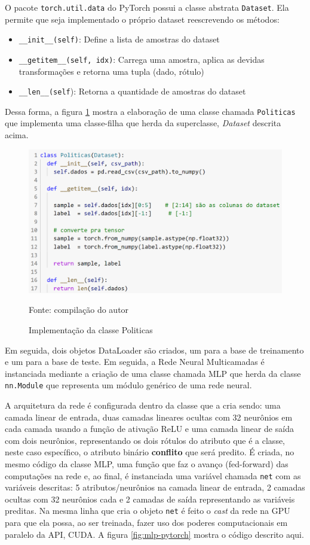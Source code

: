 O pacote \texttt{torch.util.data} do PyTorch possui a classe abstrata \texttt{Dataset}. Ela permite que seja implementado o próprio dataset reescrevendo os métodos: 

\begin{itemize}
	\item \texttt{\_\_init\_\_(self)}: Define a lista de amostras do dataset
	\item \texttt{\_\_getitem\_\_(self, idx)}: Carrega uma amostra, aplica as devidas transformações e retorna uma tupla (dado, rótulo)
	\item \texttt{\_\_len\_\_(self}): Retorna a quantidade de amostras do dataset
\end{itemize}

Dessa forma, a figura \ref{fig:classe-politicas} mostra a elaboração de uma classe chamada \texttt{Politicas} que implementa uma classe-filha que herda da superclasse, \textit{Dataset} descrita acima.

\begin{figure}[h!]
	\centering
	\includegraphics[width=.6\textwidth]{imagens/classe-politicas.png}
	\caption{Implementação da classe Politicas}
	\label{fig:classe-politicas}
	{\scriptsize Fonte: compilação do autor}
\end{figure}

Em seguida, dois objetos DataLoader são criados, um para a base de treinamento e um para a base de teste. Em seguida, a Rede Neural Multicamadas é instanciada mediante a criação de uma classe chamada MLP que herda da classe \texttt{nn.Module} que representa um módulo genérico de uma rede neural. 

A arquitetura da rede é configurada dentro da classe que a cria sendo: uma camada linear de entrada, duas camadas lineares ocultas com 32 neurônios em cada camada usando a função de ativação ReLU e uma camada linear de saída com dois neurônios, representando os dois rótulos do atributo que é a classe, neste caso específico, o atributo binário \textbf{conflito} que será predito. É criada, no mesmo código da classe MLP, uma função que faz o avanço (fed-forward) das computações na rede e, ao final, é instanciada uma variável chamada \texttt{net} com as variáveis descritas: 5 atributos/neurônios na camada linear de entrada, 2 camadas ocultas com 32 neurônios cada e 2 camadas de saída representando as variáveis preditas. Na mesma linha que cria o objeto \texttt{net} é feito o \textit{cast} da rede na GPU para que ela possa, ao ser treinada, fazer uso dos poderes computacionais em paralelo da API, CUDA. A figura \ref{fig:mlp-pytorch} mostra o código descrito aqui.

